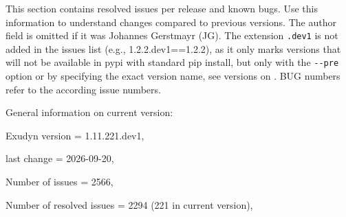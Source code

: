 %
This section contains resolved issues per release and known bugs. Use this information to understand changes compared to previous versions. The author field is omitted if it was Johannes Gerstmayr (JG).
The extension \texttt{.dev1} is not added in the issues list (e.g., 1.2.2.dev1==1.2.2), as it only marks versions that will not be available in pypi with standard pip install, but only with the \texttt{-}\texttt{-pre} option or by specifying the exact version name, see versions on .
BUG numbers refer to the according issue numbers.




\noindent General information on current version:
\bi 
  \item Exudyn version = 1.11.221.dev1, 
  \item last change =  2026-09-20, 
  \item Number of issues = 2566, 
  \item Number of resolved issues = 2294 (221 in current version), 
\ei

